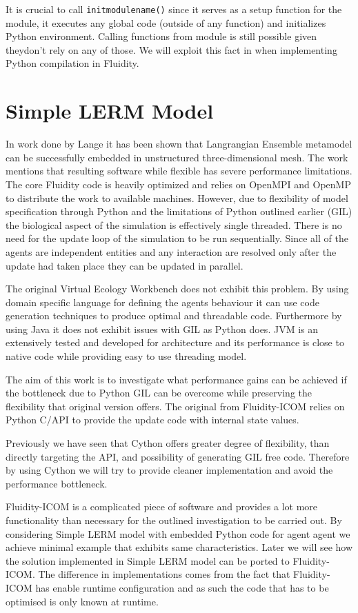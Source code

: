 \documentclass[12pt, a4paper]{report}
\begin{document}
It is crucial to call \lstinline{initmodulename()} since it serves as a setup
function for the module, it executes any global code (outside of any function)
and initializes Python environment. Calling functions from module is still
possible given theydon't rely on any of those. We will exploit this fact in
when implementing Python compilation in Fluidity.

\chapter{Simple LERM Model}\label{ch:opt-simpl-lerm}
In work done by Lange \cite{FluidityVEW} it has been shown that Langrangian
Ensemble metamodel can be successfully embedded in unstructured
three-dimensional mesh. The work mentions that resulting software while
flexible has severe performance limitations. The core Fluidity code
is heavily optimized and relies on OpenMPI and OpenMP to distribute
the work to available machines. However, due to flexibility of model
specification through Python and the limitations of Python outlined
earlier (GIL) the biological aspect of the simulation is effectively
single threaded. There is no need for the update loop of the simulation
to be run sequentially. Since all of the agents are independent
entities and any interaction are resolved only after the update had
taken place they can be updated in parallel.

The original Virtual Ecology Workbench does not exhibit this problem.
By using domain specific language for defining the agents behaviour
it can use code generation techniques to produce optimal and threadable
code. Furthermore by using Java it does not exhibit issues with GIL
as Python does. JVM is an extensively tested and developed for architecture
and its performance is close to native code while providing easy to use
threading model.

The aim of this work is to investigate what performance gains can be
achieved if the bottleneck due to Python GIL can be overcome while
preserving the flexibility that original version offers. The original
from Fluidity-ICOM relies on Python C/API to provide the update code
with internal state values.

Previously we have seen that Cython offers greater degree of flexibility,
than directly targeting the API, and possibility of generating GIL free
code. Therefore by using Cython we will try to provide cleaner implementation
and avoid the performance bottleneck.

Fluidity-ICOM is a complicated piece of software and provides a lot more
functionality than necessary for the outlined investigation to be carried
out. By considering Simple LERM model with embedded Python code for agent
agent we achieve minimal example that exhibits same characteristics. Later
we will see how the solution implemented in Simple LERM model can be ported
to Fluidity-ICOM. The difference in implementations comes from the fact
that Fluidity-ICOM has enable runtime configuration and as such the code
that has to be optimised is only known at runtime.
\end{document}
